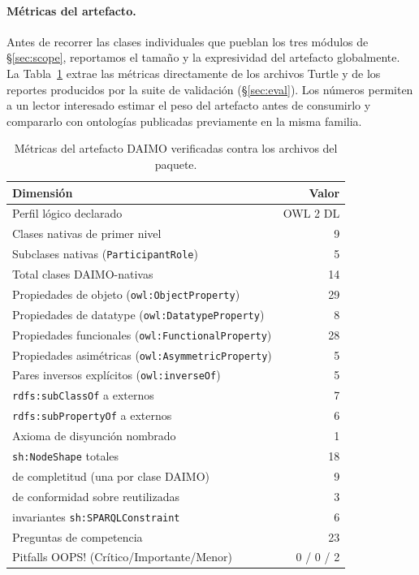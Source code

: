 \documentclass[Afour,sagev,times]{sagej}
\newcommand{\code}[1]{\texttt{#1}}
\begin{document}
\paragraph{Métricas del artefacto.}\label{sec:metrics}

Antes de recorrer las clases individuales que pueblan los tres módulos de §\ref{sec:scope}, reportamos el tamaño y la expresividad del artefacto globalmente. La Tabla~\ref{tab:metrics} extrae las métricas directamente de los archivos Turtle y de los reportes producidos por la suite de validación (§\ref{sec:eval}). Los números permiten a un lector interesado estimar el peso del artefacto antes de consumirlo y compararlo con ontologías publicadas previamente en la misma familia.

\begin{table}[t]
\small\sf\centering
\caption{Métricas del artefacto DAIMO verificadas contra los archivos del paquete.\label{tab:metrics}}
\begin{tabular}{@{}p{4.6cm}r@{}}
\toprule
\textbf{Dimensión} & \textbf{Valor} \\
\midrule
Perfil lógico declarado & OWL 2 DL \\
Clases nativas de primer nivel & 9 \\
Subclases nativas (\code{ParticipantRole}) & 5 \\
Total clases DAIMO-nativas & 14 \\
Propiedades de objeto (\code{owl:ObjectProperty}) & 29 \\
Propiedades de datatype (\code{owl:DatatypeProperty}) & 8 \\
Propiedades funcionales (\code{owl:FunctionalProperty}) & 28 \\
Propiedades asimétricas (\code{owl:AsymmetricProperty}) & 5 \\
Pares inversos explícitos (\code{owl:inverseOf}) & 5 \\
\code{rdfs:subClassOf} a externos & 7 \\
\code{rdfs:subPropertyOf} a externos & 6 \\
Axioma de disyunción nombrado & 1 \\
\code{sh:NodeShape} totales & 18 \\
\quad de completitud (una por clase DAIMO) & 9 \\
\quad de conformidad sobre reutilizadas & 3 \\
\quad invariantes \code{sh:SPARQLConstraint} & 6 \\
Preguntas de competencia & 23 \\
Pitfalls OOPS! (Crítico/Importante/Menor) & 0 / 0 / 2 \\
\bottomrule
\end{tabular}
\end{table}
\end{document}
